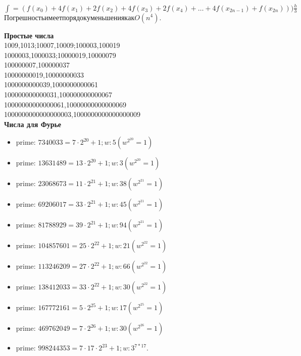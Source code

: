 \documentclass[a4paper,12pt]{article}
\begin{document}
$\int = (f(x_0)+4f(x_1)+2f(x_2)+4f(x_3)+2f(x_4)+\ldots+4f(x_{2n-1})+f(x_{2n}))) \frac h 3$\\
$Погрешность имеет порядок уменьшения как O(n^4).$

{\bf Простые числа}\\
1009,1013;10007,10009;100003,100019\\
1000003,1000033;10000019,10000079\\
100000007,100000037\\
10000000019,10000000033\\
1000000000039,1000000000061\\
100000000000031,100000000000067\\
10000000000000061,10000000000000069\\
1000000000000000003,1000000000000000009\\

{\bf Числа для Фурье}\\
\begin{itemize}
\item prime: $7340033 = 7·2^{20} + 1; w: 5 (w^{2^{20}} = 1)$
\item prime: $13631489 = 13·2^{20} + 1; w: 3 (w^{2^{20}} = 1)$
\item prime: $23068673 = 11·2^{21} + 1; w: 38 (w^{2^{21}} = 1)$
\item prime: $69206017 = 33·2^{21} + 1; w: 45 (w^{2^{21}} = 1)$
\item prime: $81788929 = 39·2^{21} + 1; w: 94 (w^{2^{21}} = 1)$
\item prime: $104857601 = 25·2^{22} + 1; w: 21 (w^{2^{22}} = 1)$
\item prime: $113246209 = 27·2^{22} + 1; w: 66 (w^{2^{22}} = 1)$
\item prime: $138412033 = 33·2^{22} + 1; w: 30 (w^{2^{22}} = 1)$
\item prime: $167772161 = 5·2^{25} + 1; w: 17 (w^{2^{25}} = 1)$
\item prime: $469762049 = 7·2^{26} + 1; w: 30 (w^{2^{26}} = 1)$
\item prime: $998244353 = 7·17·2^{23} + 1; w: 3^{7 * 17}$.
\end{itemize}
\end{document}
